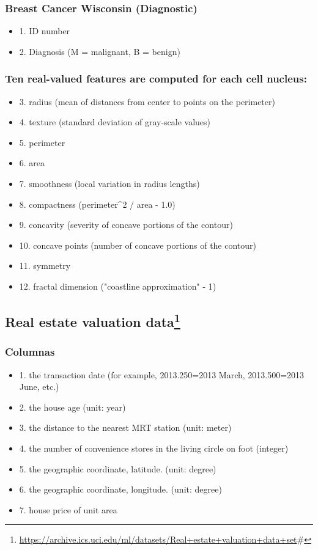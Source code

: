 \documentclass[12pt]{article}
\begin{document}
\subsubsection*{Breast Cancer Wisconsin (Diagnostic)}
\label{sec:org81821bd}
\begin{itemize}
\item 1. ID number
\item 2. Diagnosis (M = malignant, B = benign)
\end{itemize}

\subsubsection*{Ten real-valued features are computed for each cell nucleus:}
\label{sec:org3ba088e}
\begin{itemize}
\item 3. radius (mean of distances from center to points on the perimeter)
\item 4. texture (standard deviation of gray-scale values)
\item 5. perimeter
\item 6. area
\item 7. smoothness (local variation in radius lengths)
\item 8. compactness (perimeter\^{}2 / area - 1.0)
\item 9. concavity (severity of concave portions of the contour)
\item 10. concave points (number of concave portions of the contour)
\item 11. symmetry
\item 12. fractal dimension ("coastline approximation" - 1)
\end{itemize}


\subsection*{Real estate valuation data\footnote{\url{https://archive.ics.uci.edu/ml/datasets/Real+estate+valuation+data+set}\#

\pagebreak}}
\label{sec:orgf0e5a32}
\subsubsection*{Columnas}
\label{sec:org0b03a1d}
\begin{itemize}
\item 1. the transaction date (for example, 2013.250=2013 March, 2013.500=2013 June, etc.)
\item 2. the house age (unit: year)
\item 3. the distance to the nearest MRT station (unit: meter)
\item 4. the number of convenience stores in the living circle on foot (integer)
\item 5. the geographic coordinate, latitude. (unit: degree)
\item 6. the geographic coordinate, longitude. (unit: degree)
\item 7. house price of unit area
\end{itemize}
\end{document}
